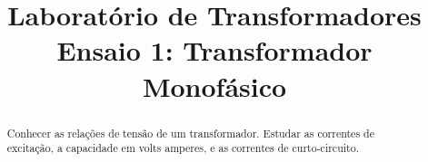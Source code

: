 \documentclass[conference]{IEEEtran}
\begin{document}
%
\title{Laboratório de Transformadores\\Ensaio 1: Transformador Monofásico}


\author{
}


% 








\maketitle


\begin{abstract}
Conhecer as relações de tensão de um transformador. Estudar as correntes
de excitação, a capacidade em volts amperes, e as correntes de curto-circuito.

\end{abstract}
\end{document}
